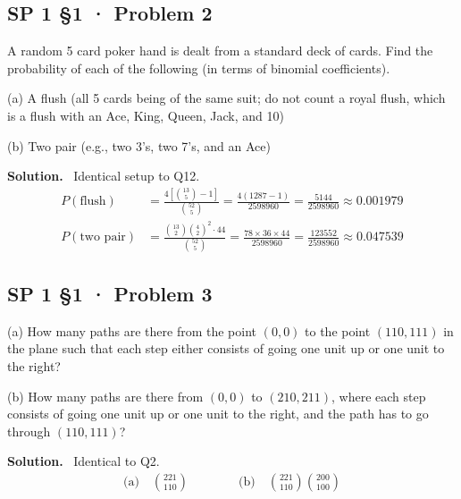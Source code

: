 \documentclass[11pt]{article}
\newcommand{\Sol}{\vspace{2pt}\noindent\textbf{Solution.}\ }
\begin{document}
\subsection{SP 1 §1 · Problem 2}
\begin{qbox}
A random 5 card poker hand is dealt from a standard deck of cards. Find the probability of each of the following (in terms of binomial coefficients).

(a) A flush (all 5 cards being of the same suit; do not count a royal flush, which is a flush with an Ace, King, Queen, Jack, and 10)

(b) Two pair (e.g., two 3's, two 7's, and an Ace)
\end{qbox}
\Sol
Identical setup to Q12.
\begin{align*}
P(\text{flush}) &= \frac{4\left[\binom{13}{5}-1\right]}{\binom{52}{5}} = \frac{4(1287-1)}{2598960}=\frac{5144}{2598960}\approx 0.001979\\[4pt]
P(\text{two pair}) &= \frac{\binom{13}{2}\binom{4}{2}^2\cdot 44}{\binom{52}{5}} = \frac{78\times 36\times 44}{2598960}=\frac{123552}{2598960}\approx 0.047539
\end{align*}

\subsection{SP 1 §1 · Problem 3}
\begin{qbox}
(a) How many paths are there from the point $(0, 0)$ to the point $(110, 111)$ in the plane such that each step either consists of going one unit up or one unit to the right?

(b) How many paths are there from $(0, 0)$ to $(210, 211)$, where each step consists of going one unit up or one unit to the right, and the path has to go through $(110, 111)$?
\end{qbox}
\Sol
Identical to Q2.
\begin{align*}
\text{(a)}\quad \binom{221}{110} \qquad\qquad
\text{(b)}\quad \binom{221}{110}\binom{200}{100}
\end{align*}

\end{document}
